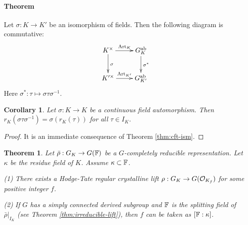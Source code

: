 \documentclass[10pt,a4paper,twoside]{article}
\newtheorem{cor}{Corollary}
\newtheorem{thm}{Theorem}
\begin{document}
\paragraph{\bf Theorem}{\cite[6.11]{Iw86}}
\label{thm:cft-ism}
Let $\sigma: K\to K'$ be an isomorphism of fields.
Then the following diagram is commutative:
$$
\xymatrix{
    K^{\times} \ar[d]^{\sigma} \ar[r]^{\Art_K} & G_K^{\ab}\ar[d]^{\sigma^*}\\
    K'^{\times} \ar[r]^{\Art_{K'}} & G_{K'}^{\ab}
}
$$
Here $\sigma^*: \tau \mapsto \sigma\tau\sigma^{-1}$.




\begin{cor}
\label{cor:rF-twist}
Let $\sigma: K\to K$ be a continuous field automorphism.
Then $r_K(\sigma \tau \sigma^{-1}) = \sigma (r_K(\tau))$ for all $\tau\in I_K$.
\end{cor}


\begin{proof}
It is an immediate consequence of Theorem \ref{thm:cft-ism}.
\end{proof}


\begin{thm}
\label{thm:ht-regular-lift}
Let $\bar\rho : G_K \to G({\mathbb{F}})$ be a $G$-completely reducible representation.
Let $\kappa$ be the residue field of $K$.
Assume $\kappa\subset {\mathbb{F}}$.


(1) There exists a Hodge-Tate regular crystalline lift
$\rho: G_K \to G(\mathcal{O}_{K_f})$
for some positive integer $f$.

(2) If $G$ has a simply connected derived subgroup and ${\mathbb{F}}$ is the splitting field of $\bar\rho|_{I_K}$ (see Theorem \ref{thm:irreducible-lift}), then $f$ can be taken as $[{\mathbb{F}}:\kappa]$.
\end{thm}
\end{document}
